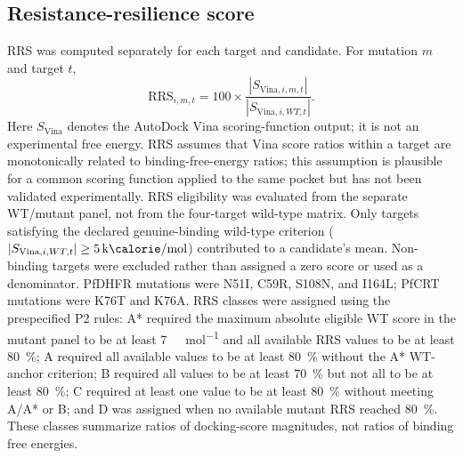 \documentclass[journal=jcisd8,manuscript=article]{achemso}
\begin{document}
\subsection{Resistance-resilience score}
RRS was computed separately for each target and candidate. For mutation $m$ and target $t$,
\begin{equation}
\mathrm{RRS}_{i,m,t}=100\times\frac{|S_{\mathrm{Vina},i,m,t}|}{|S_{\mathrm{Vina},i,WT,t}|}.
\label{eq:rrs}
\end{equation}
Here $S_{\mathrm{Vina}}$ denotes the AutoDock Vina scoring-function output; it is not an experimental free energy. RRS assumes that Vina score ratios within a target are monotonically related to binding-free-energy ratios; this assumption is plausible for a common scoring function applied to the same pocket but has not been validated experimentally. RRS eligibility was evaluated from the separate WT/mutant panel, not from the four-target wild-type matrix. Only targets satisfying the declared genuine-binding wild-type criterion ($|S_{\mathrm{Vina},i,WT,t}|\geq\qty{5}{\kilo\calorie\per\mole}$) contributed to a candidate's mean. Non-binding targets were excluded rather than assigned a zero score or used as a denominator. PfDHFR mutations were N51I, C59R, S108N, and I164L; PfCRT mutations were K76T and K76A. RRS classes were assigned using the prespecified P2 rules: A* required the maximum absolute eligible WT score in the mutant panel to be at least \qty{7}{\kilo\calorie\per\mole} and all available RRS values to be at least \qty{80}{\percent}; A required all available values to be at least \qty{80}{\percent} without the A* WT-anchor criterion; B required all values to be at least \qty{70}{\percent} but not all to be at least \qty{80}{\percent}; C required at least one value to be at least \qty{80}{\percent} without meeting A/A* or B; and D was assigned when no available mutant RRS reached \qty{80}{\percent}. These classes summarize ratios of docking-score magnitudes, not ratios of binding free energies.
\end{document}
